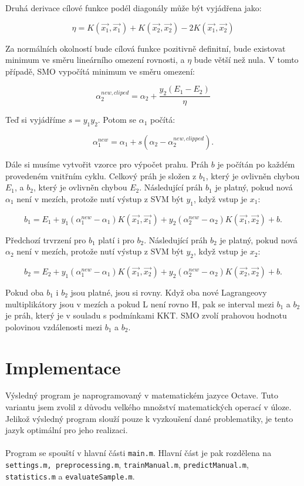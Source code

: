 \documentclass[a4]{article}
\begin{document}
\noindent Druhá derivace cílové funkce podél diagonály může být vyjádřena jako:

$$
\eta=K(\vec{x_1},\vec{x_1}) + K(\vec{x_2},\vec{x_2}) -2K(\vec{x_1},\vec{x_2})
$$

\noindent Za normálních okolností bude cílová funkce pozitivně definitní, bude existovat
minimum ve směru lineárního omezení rovnosti, a $\eta$ bude větší než nula. V
tomto případě, SMO vypočítá minimum ve směru omezení:

$$
\alpha_{2}^{new,cliped} = \alpha_{2}+\frac{y_{2}(E_{1}-E_{2})}{\eta}
$$

\noindent Teď si vyjádříme $s=y_{1}y_{2}$. Potom se $\alpha_1$ počítá:

$$
\alpha_{1}^{new}=\alpha_{1}+s(\alpha_{2}-\alpha_{2}^{new,clipped}).
$$

\noindent Dále si musíme vytvořit vzorce pro výpočet prahu. Práh $b$ je počítán po každém provedeném vnitřním cyklu. Celkový práh je složen z $b_1$, který  je ovlivněn chybou $E_1$, a $b_2$, který je ovlivněn chybou $E_2$. Následující práh $b_1$ je platný, pokud nová $\alpha_{1}$ není v mezích, protože nutí výstup z SVM být $y_1$, když vstup je $x_1$:

$$
b_1=E_1+y_1(\alpha_1^{new}-\alpha_{1})K(\vec{x_1},\vec{x_1})+y_2(\alpha_2^{new}-\alpha_2)K(\vec{x_1},\vec{x_2})+b.
$$

\noindent Předchozí trvrzení pro $b_1$ platí i pro $b_2$. Následující práh $b_2$ je platný, pokud nová $\alpha_{2}$ není v mezích, protože nutí výstup z SVM být $y_2$, když vstup je $x_2$:

$$
b_2=E_2+y_1(\alpha_1^{new}-\alpha_{1})K(\vec{x_1},\vec{x_2})+y_2(\alpha_2^{new}-\alpha_2)K(\vec{x_2},\vec{x_2})+b.
$$

\noindent Pokud oba $b_1$ i $b_2$ jsou platné, jsou si rovny. Když oba nové Lagrangeovy multiplikátory jsou v mezích a pokud L není rovno H, pak se interval mezi $b_1$ a $b_2$ je práh, který je v souladu s podmínkami KKT. SMO zvolí prahovou hodnotu polovinou vzdálenosti mezi $b_1$ a $b_2$.\cite{smo_platt_original}

\section{Implementace}
Výsledný program je naprogramovaný v matematickém jazyce Octave. Tuto variantu jsem zvolil z důvodu velkého množství matematických operací v úloze. Jelikož výsledný program slouží pouze k vyzkoušení dané problematiky, je tento jazyk optimální pro jeho realizaci.
\\\\
Program se spouští v hlavní části \texttt{main.m}. Hlavní část je pak rozdělena na \texttt{settings.m, preprocessing.m}, \texttt{trainManual.m}, \texttt{predictManual.m}, \texttt{statistics.m} a \texttt{evaluateSample.m}.
\end{document}
